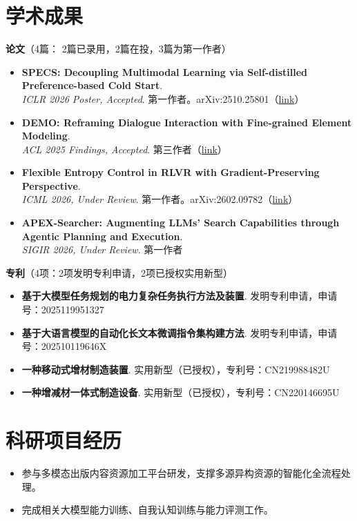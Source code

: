 \documentclass{resume}
\begin{document}
\section{学术成果}
\textbf{论文}（4篇： 2篇已录用，2篇在投，3篇为第一作者）
\begin{itemize}[parsep=0.2ex]
    \item \textbf{SPECS: Decoupling Multimodal Learning via Self-distilled Preference-based Cold Start}. \\\textit{ICLR 2026 Poster, Accepted}. 第一作者。arXiv:2510.25801（\href{https://arxiv.org/abs/2510.25801}{link}）
    \item \textbf{DEMO: Reframing Dialogue Interaction with Fine-grained Element Modeling}. \\\textit{ACL 2025 Findings, Accepted}. 第三作者（\href{https://aclanthology.org/2025.findings-acl.594/}{link}）
    \item \textbf{Flexible Entropy Control in RLVR with Gradient-Preserving Perspective}. \\\textit{ICML 2026, Under Review}. 第一作者。arXiv:2602.09782（\href{https://arxiv.org/abs/2602.09782}{link}）
    \item \textbf{APEX-Searcher: Augmenting LLMs' Search Capabilities through Agentic Planning and Execution}. \\\textit{SIGIR 2026, Under Review}. 第一作者
\end{itemize}

\textbf{专利}（4项：2项发明专利申请，2项已授权实用新型）
\begin{itemize}[parsep=0.2ex]
    \item \textbf{基于大模型任务规划的电力复杂任务执行方法及装置}. 发明专利申请，申请号：2025119951327
    \item \textbf{基于大语言模型的自动化长文本微调指令集构建方法}. 发明专利申请，申请号：202510119646X
    \item \textbf{一种移动式增材制造装置}. 实用新型（已授权），专利号：CN219988482U
    \item \textbf{一种增减材一体式制造设备}. 实用新型（已授权），专利号：CN220146695U
\end{itemize}

\section{科研项目经历}
\begin{itemize}
    \item 参与多模态出版内容资源加工平台研发，支撑多源异构资源的智能化全流程处理。
    \item 完成相关大模型能力训练、自我认知训练与能力评测工作。
\end{itemize}
\end{document}
